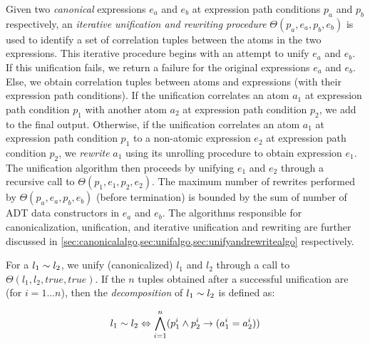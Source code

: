 Given two {\em canonical} expressions $e_a$ and $e_b$ at expression path conditions $p_a$ and $p_b$
respectively, an {\em iterative unification and rewriting procedure}
$\Theta(p_a,e_a,p_b,e_b)$ is used to identify a set of correlation tuples
between the atoms in the two expressions.
This iterative procedure begins with an attempt to unify $e_a$ and $e_b$.
If this unification fails, we return a failure for the original expressions $e_a$ and $e_b$.
Else, we obtain correlation tuples between atoms and expressions
(with their expression path conditions).
If the unification correlates an atom $a_1$ at expression path condition $p_1$
with another atom $a_2$ at expression path condition $p_2$, we add  to the final output.
Otherwise, if the unification correlates an atom $a_1$ at expression path condition $p_1$
to a non-atomic expression $e_2$ at expression path condition $p_2$,
we {\em rewrite} $a_1$ using its unrolling procedure to obtain expression $e_1$.
The unification algorithm then proceeds by unifying $e_1$ and $e_2$ through
a recursive call to $\Theta(p_1,e_1,p_2,e_2)$.
The maximum number of rewrites performed by $\Theta(p_a,e_a,p_b,e_b)$ (before termination)
is bounded by the sum of number of ADT data constructors in $e_a$ and $e_b$.
The algorithms responsible for canonicalization, unification, and iterative unification and rewriting
are further discussed in \cref{sec:canonicalalgo,sec:unifalgo,sec:unifyandrewritealgo} respectively.

For a \recursiveRelation{} $l_1 \sim{} l_2$, we unify (canonicalized) $l_1$ and $l_2$ through a
call to $\Theta(l_1,l_2,true,true)$.
If the $n$ tuples obtained after a successful unification are 
(for $i=1\ldots n$), then the {\em decomposition} of $l_1 \sim{} l_2$ is defined as:

\begin{equation}
\label{eqn:decompose}
l_1 \sim{} l_2 \Leftrightarrow \bigwedge \limits_{i=1}^n (p_1^i \land p_2^i \rightarrow (a_1^i = a_2^i))
\end{equation}

